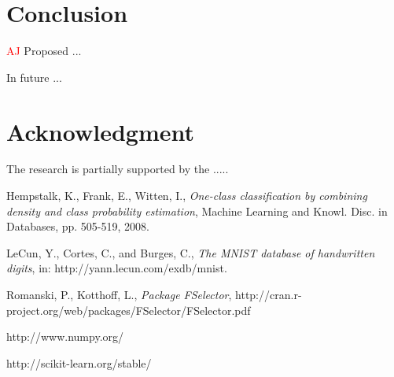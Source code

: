 \documentclass{llncs}
\begin{document}
\section{Conclusion}
  \label{Conclusion}

\textcolor{red} {AJ}
Proposed ...

In future ...


\section*{Acknowledgment}

\noindent The research is partially supported by the .....

\begin{thebibliography}{1}

Hempstalk, K., Frank, E., Witten, I., \emph{One-class classification by combining density and class probability estimation}, Machine Learning and Knowl. Disc. in Databases, pp. 505-519, 2008.

LeCun, Y., Cortes, C., and Burges, C., \emph{The MNIST database of handwritten digits}, in: http://yann.lecun.com/exdb/mnist.

Romanski, P., Kotthoff, L., \emph{Package FSelector}, http://cran.r-project.org/web/packages/FSelector/FSelector.pdf

http://www.numpy.org/

http://scikit-learn.org/stable/

\end{thebibliography}
\end{document}
